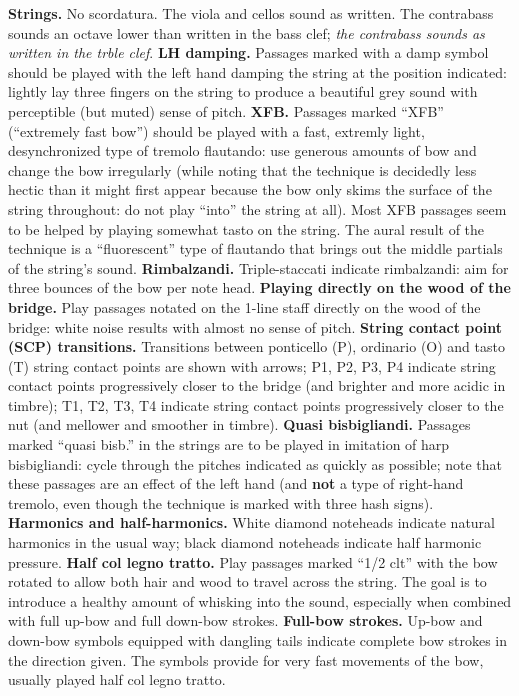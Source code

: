 \textbf{Strings.} No scordatura. The viola and cellos sound as written. The
contrabass sounds an octave lower than written in the bass clef; \textit{the
contrabass sounds as written in the trble clef}. \textbf{LH damping.} Passages
marked with a damp symbol should be played with the left hand damping the
string at the position indicated: lightly lay three fingers on the string to
produce a beautiful grey sound with perceptible (but muted) sense of pitch.
\textbf{XFB.} Passages marked ``XFB'' (``extremely fast bow'') should be played
with a fast, extremly light, desynchronized type of tremolo flautando: use
generous amounts of bow and change the bow irregularly (while noting that the
technique is decidedly less hectic than it might first appear because the bow
only skims the surface of the string throughout: do not play ``into'' the
string at all). Most XFB passages seem to be helped by playing somewhat tasto
on the string. The aural result of the technique is a ``fluorescent'' type of
flautando that brings out the middle partials of the string's sound.
\textbf{Rimbalzandi.} Triple-staccati indicate rimbalzandi: aim for three
bounces of the bow per note head. \textbf{Playing directly on the wood of the
bridge.} Play passages notated on the 1-line staff directly on the wood of the
bridge: white noise results with almost no sense of pitch. \textbf{String
contact point (SCP) transitions.} Transitions between ponticello (P), ordinario
(O) and tasto (T) string contact points are shown with arrows; P1, P2, P3, P4
indicate string contact points progressively closer to the bridge (and brighter
and more acidic in timbre); T1, T2, T3, T4 indicate string contact points
progressively closer to the nut (and mellower and smoother in timbre).
\textbf{Quasi bisbigliandi.} Passages marked ``quasi bisb.'' in the strings are
to be played in imitation of harp bisbigliandi: cycle through the pitches
indicated as quickly as possible; note that these passages are an effect of the
left hand (and \textbf{not} a type of right-hand tremolo, even though the
technique is marked with three hash signs). \textbf{Harmonics and
half-harmonics.} White diamond noteheads indicate natural harmonics in the
usual way; black diamond noteheads indicate half harmonic pressure.
\textbf{Half col legno tratto.} Play passages marked ``1/2 clt'' with the bow
rotated to allow both hair and wood to travel across the string. The goal is to
introduce a healthy amount of whisking into the sound, especially when combined
with full up-bow and full down-bow strokes. \textbf{Full-bow strokes.} Up-bow
and down-bow symbols equipped with dangling tails indicate complete bow strokes
in the direction given. The symbols provide for very fast movements of the bow,
usually played half col legno tratto.
